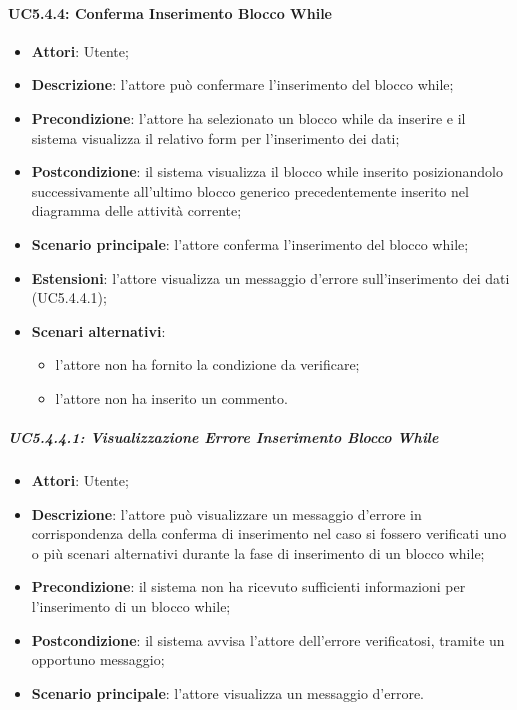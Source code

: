 \paragraph{UC5.4.4: Conferma Inserimento Blocco While}
\label{UC5.4.4}
\begin{itemize}
	\item \textbf{Attori}: Utente;
	\item \textbf{Descrizione}: l'attore può confermare l'inserimento del blocco while;
	\item \textbf{Precondizione}: l'attore ha selezionato un blocco while da inserire e il sistema visualizza il relativo form per l'inserimento dei dati;
	\item \textbf{Postcondizione}: il sistema visualizza il blocco while inserito posizionandolo successivamente all'ultimo blocco generico precedentemente inserito nel diagramma delle attività corrente;
	\item \textbf{Scenario principale}: l'attore conferma l'inserimento del blocco while;
	\item \textbf{Estensioni}: l'attore visualizza un messaggio d'errore sull'inserimento dei dati (UC5.4.4.1);
	\item \textbf{Scenari alternativi}:
	\begin{itemize}
		\item l'attore non ha fornito la condizione da verificare;
		\item l'attore non ha inserito un commento.
	\end{itemize}
\end{itemize}

\subparagraph{UC5.4.4.1: Visualizzazione Errore Inserimento Blocco While}
\label{UC5.4.4.1}
\begin{itemize}
	\item \textbf{Attori}: Utente;
	\item \textbf{Descrizione}: l'attore può visualizzare un messaggio d'errore in corrispondenza della conferma di inserimento nel caso si fossero verificati uno o più scenari alternativi durante la fase di inserimento di un blocco while;
	\item \textbf{Precondizione}: il sistema non ha ricevuto sufficienti informazioni per l'inserimento di un blocco while;
	\item \textbf{Postcondizione}: il sistema avvisa l'attore dell'errore verificatosi, tramite un opportuno messaggio;
	\item \textbf{Scenario principale}: l'attore visualizza un messaggio d'errore.
\end{itemize}

